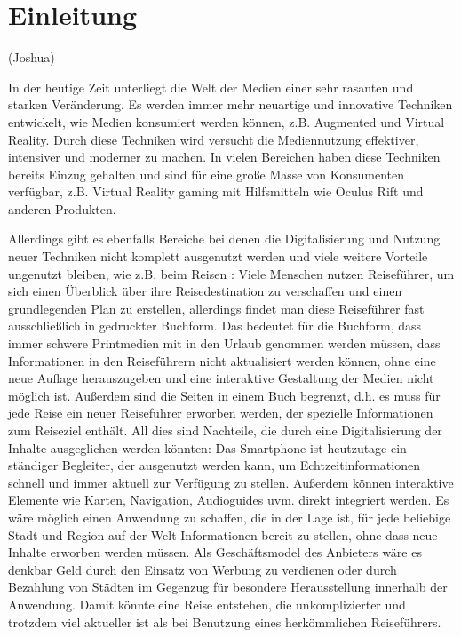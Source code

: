 \chapter{Einleitung}

	(Joshua)

	In der heutige Zeit unterliegt die Welt der Medien einer sehr rasanten und starken Veränderung. Es werden immer mehr neuartige und innovative Techniken entwickelt, wie Medien konsumiert werden können, z.B. Augmented und Virtual Reality. Durch diese Techniken wird versucht die Mediennutzung effektiver, intensiver und moderner zu machen. In vielen Bereichen haben diese Techniken bereits Einzug gehalten und sind für eine große Masse von Konsumenten verfügbar, z.B. Virtual Reality gaming mit Hilfsmitteln wie Oculus Rift \cite{FacebookTechnologies.4232020} und anderen Produkten.

	\vspace{0.25cm}

	Allerdings gibt es ebenfalls Bereiche bei denen die Digitalisierung und Nutzung neuer Techniken nicht komplett ausgenutzt werden und viele weitere Vorteile ungenutzt bleiben, wie z.B. beim Reisen \cite{Dredge.2018}: Viele Menschen nutzen Reiseführer, um sich einen Überblick über ihre Reisedestination zu verschaffen und einen grundlegenden Plan zu erstellen, allerdings findet man diese Reiseführer fast ausschließlich in gedruckter Buchform. Das bedeutet für die Buchform, dass immer schwere Printmedien mit in den Urlaub genommen werden müssen, dass Informationen in den Reiseführern nicht aktualisiert werden können, ohne eine neue Auflage herauszugeben und eine interaktive Gestaltung der Medien nicht möglich ist. Außerdem sind die Seiten in einem Buch begrenzt, d.h. es muss für jede Reise ein neuer Reiseführer erworben werden, der spezielle Informationen zum Reiseziel enthält. All dies sind Nachteile, die durch eine Digitalisierung der Inhalte ausgeglichen werden könnten: Das Smartphone ist heutzutage ein ständiger Begleiter, der ausgenutzt werden kann, um Echtzeitinformationen schnell und immer aktuell zur Verfügung zu stellen. Außerdem können interaktive Elemente wie Karten, Navigation, Audioguides uvm. direkt integriert werden. Es wäre möglich einen Anwendung zu schaffen, die in der Lage ist, für jede beliebige Stadt und Region auf der Welt Informationen bereit zu stellen, ohne dass neue Inhalte erworben werden müssen. Als Geschäftsmodel des Anbieters wäre es denkbar Geld durch den Einsatz von Werbung zu verdienen oder durch Bezahlung von Städten im Gegenzug für besondere Herausstellung innerhalb der Anwendung.  Damit könnte eine Reise entstehen, die unkomplizierter und trotzdem viel aktueller ist als bei Benutzung eines herkömmlichen Reiseführers.


